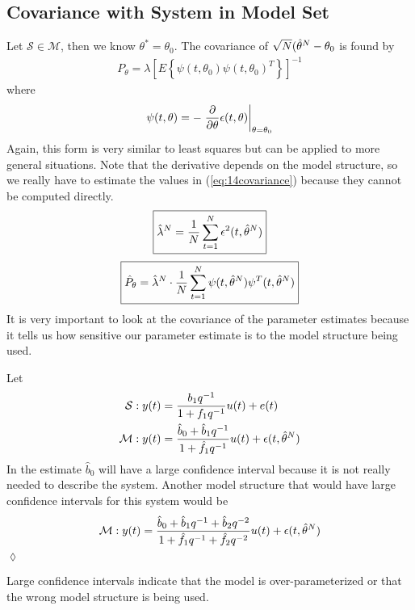 \subsection{Covariance with System in Model Set}
\label{sec:varsinm}
Let $\mathcal{S}\in\mathcal{M}$, then we know $\theta^\ast=\theta_0$. The covariance of $\sqrt{N}(\hat{\theta}^N-\theta_0$ is found by
\begin{align}
\label{eq:14covariance}
\boxed{P_\theta = \lambda\left[E\left\lbrace \psi(t,\theta_0)\psi(t,\theta_0)^T\right\rbrace\right]^{-1}}
\end{align}
where
$$\psi(t,\theta) = -\left.\frac{\partial}{\partial\theta}\epsilon(t,\theta)\right|_{\theta=\theta_0}$$
Again, this form is very similar to least squares but can be applied to more general situations. Note that the derivative depends on the model structure, so we really have to estimate the values in (\ref{eq:14covariance}) because they cannot be computed directly.
\begin{align*}
\boxed{\hat{\lambda}^N = \frac{1}{N}\sum_{t=1}^N\epsilon^2(t,\hat{\theta}^N)}
\end{align*}
\begin{align*}
\boxed{\hat{P}_\theta = \hat{\lambda}^N\cdot\frac{1}{N}\sum_{t=1}^N\psi(t,\hat{\theta}^N)\psi^T(t,\hat{\theta}^N)}
\end{align*}
It is very important to look at the covariance of the parameter estimates because it tells us how sensitive our parameter estimate is to the model structure being used.

\begin{example}
Let
\begin{align*}
\mathcal{S}: y(t) &= \frac{b_1q^{-1}}{1+f_1q^{-1}}u(t) + e(t) \\
\mathcal{M}: y(t) &= \frac{\hat{b}_0 + \hat{b}_1q^{-1}}{1+\hat{f}_1q^{-1}}u(t) + \epsilon(t,\hat{\theta}^N)
\end{align*}
In the estimate $\hat{b}_0$ will have a large confidence interval because it is not really needed to describe the system. Another model structure that would have large confidence intervals for this system would be
$$\mathcal{M}: y(t) = \frac{\hat{b}_0+\hat{b}_1q^{-1}+\hat{b}_2q^{-2}}{1+\hat{f}_1q^{-1}+\hat{f}_2q^{-2}}u(t)+\epsilon(t,\hat{\theta}^N)$$
$\lozenge$
\end{example}

Large confidence intervals indicate that the model is over-parameterized or that the wrong model structure is being used.

